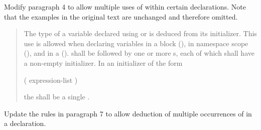 Modify paragraph 4 to allow multiple uses of  within
certain declarations. Note that the examples in the original text are 
unchanged and therefore omitted.

\begin{quote}
\setcounter{Paras}{3}
\pnum
The type of a variable declared using  or 
 is deduced from its initializer. This use 
is allowed when declaring variables 
in a block 
(), 
in namespace scope
(), and 
in a  
().
% 
% 
% 
  
shall be followed by one or more s,
each of which shall have a non-empty initializer.
% 
In an initializer of the form
\begin{codeblock}
( expression-list )
\end{codeblock}
the  shall be a 
single .
\end{quote}

Update the rules in paragraph 7 to allow deduction of multiple
occurrences of  in a declaration.

